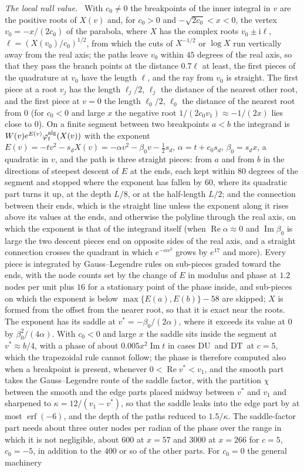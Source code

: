 \documentclass[ecta,nameyear,final,supplement]{econsocart}
\newcommand{\iu}{{\mathrm i}}
\newcommand{\Rea}{\operatorname{Re}}
\newcommand{\Ima}{\operatorname{Im}}
\newcommand{\erf}{\operatorname{erf}}
\newcommand{\Fu}{\textsf{\upshape DU}}
\newcommand{\Ft}{\textsf{\upshape DT}}
\theoremstyle{plain}
\theoremstyle{definition}
\newcommand{\runin}[1]{\par\medskip\noindent\textit{#1.}\ \ignorespaces}
\begin{document}
\runin{The local null value}  With $c_0\ne0$ the breakpoints of the inner integral in $v$ are the positive roots of $X(v)$ and, for $c_0>0$ and $-\sqrt{2c_0}<x<0$, the vertex $v_0=-x/(2c_0)$ of the parabola, where $X$ has the complex roots $v_0\pm\iu\ell$, $\ell=(X(v_0)/c_0)^{1/2}$, from which the cuts of $X^{-1/2}$ or $\log X$ run vertically away from the real axis; the paths leave $v_0$ within $45$ degrees of the real axis, so that they pass the branch points at the distance $0.7\ell$ at least, the first pieces of the quadrature at $v_0$ have the length $\ell$, and the ray from $v_0$ is straight.  The first piece at a root $v_j$ has the length $\ell_j/2$, $\ell_j$ the distance of the nearest other root, and the first piece at $v=0$ the length $\ell_0/2$, $\ell_0$ the distance of the nearest root from $0$ (for $c_0<0$ and large $x$ the negative root $1/(2c_0v_1)\approx-1/(2x)$ lies close to $0$).  On a finite segment between two breakpoints $a<b$ the integrand is $W(v)e^{E(v)}\varphi^{\rm alg}_t(X(v))$ with the exponent $E(v)=-tv^2-s_dX(v)=-\alpha v^2-\beta_0v-\frac12s_d$, $\alpha=t+c_0s_d$, $\beta_0=s_dx$, a quadratic in $v$, and the path is three straight pieces: from $a$ and from $b$ in the directions of steepest descent of $E$ at the ends, each kept within $80$ degrees of the segment and stopped where the exponent has fallen by $60$, where its quadratic part turns it up, at the depth $L/8$, or at the half-length $L/2$; and the connection between their ends, which is the straight line unless the exponent along it rises above its values at the ends, and otherwise the polyline through the real axis, on which the exponent is that of the integrand itself (when $\Rea\alpha\approx0$ and $\Ima\beta_0$ is large the two descent pieces end on opposite sides of the real axis, and a straight connection crosses the quadrant in which $e^{-\alpha v^2}$ grows by $e^{17}$ and more).  Every piece is integrated by Gauss--Legendre rules on sub-pieces graded toward the ends, with the node counts set by the change of $E$ in modulus and phase at $1.2$ nodes per unit plus $16$ for a stationary point of the phase inside, and sub-pieces on which the exponent is below $\max\{E(a),E(b)\}-58$ are skipped; $X$ is formed from the offset from the nearer root, so that it is exact near the roots.  The exponent has its saddle at $v^*=-\beta_0/(2\alpha)$, where it exceeds its value at $0$ by $\beta_0^2/(4\alpha)$.  With $c_0<0$ and large $x$ the saddle sits inside the segment at $v^*\approx b/4$, with a phase of about $0.005x^2\Ima t$ in cases \Fu\ and \Ft\ at $c=5$, which the trapezoidal rule cannot follow; the phase is therefore computed also when a breakpoint is present, whenever $0<\Rea v^*<v_1$, and the smooth part takes the Gauss--Legendre route of the saddle factor, with the partition $\chi$ between the smooth and the edge parts placed midway between $v^*$ and $v_1$ and sharpened to $\kappa=12/(v_1-v^*)$, so that the saddle leaks into the edge part by at most $\erf(-6)$, and the depth of the paths reduced to $1.5/\kappa$.  The saddle-factor part needs about three outer nodes per radian of the phase over the range in which it is not negligible, about $600$ at $x=57$ and $3000$ at $x=266$ for $c=5$, $c_0=-5$, in addition to the $400$ or so of the other parts.  For $c_0=0$ the general machinery 
\end{document}
